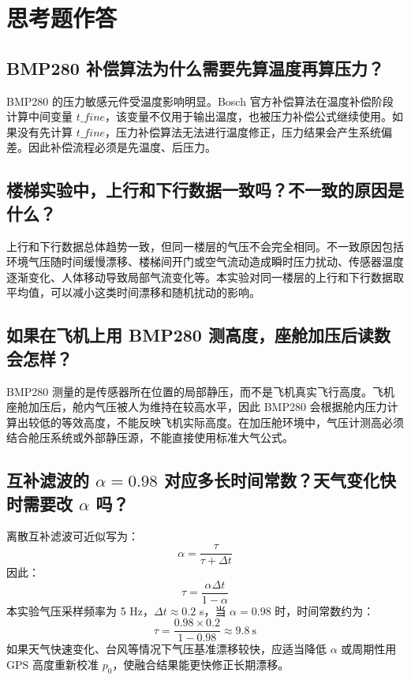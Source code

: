 \documentclass[UTF8,a4paper,12pt]{ctexart}
\begin{document}
\section{思考题作答}

\subsection{BMP280 补偿算法为什么需要先算温度再算压力？}

BMP280 的压力敏感元件受温度影响明显。Bosch 官方补偿算法在温度补偿阶段计算中间变量 $t\_fine$，该变量不仅用于输出温度，也被压力补偿公式继续使用。如果没有先计算 $t\_fine$，压力补偿算法无法进行温度修正，压力结果会产生系统偏差。因此补偿流程必须是先温度、后压力。

\subsection{楼梯实验中，上行和下行数据一致吗？不一致的原因是什么？}

上行和下行数据总体趋势一致，但同一楼层的气压不会完全相同。不一致原因包括环境气压随时间缓慢漂移、楼梯间开门或空气流动造成瞬时压力扰动、传感器温度逐渐变化、人体移动导致局部气流变化等。本实验对同一楼层的上行和下行数据取平均值，可以减小这类时间漂移和随机扰动的影响。

\subsection{如果在飞机上用 BMP280 测高度，座舱加压后读数会怎样？}

BMP280 测量的是传感器所在位置的局部静压，而不是飞机真实飞行高度。飞机座舱加压后，舱内气压被人为维持在较高水平，因此 BMP280 会根据舱内压力计算出较低的等效高度，不能反映飞机实际高度。在加压舱环境中，气压计测高必须结合舱压系统或外部静压源，不能直接使用标准大气公式。

\subsection{互补滤波的 $\alpha=0.98$ 对应多长时间常数？天气变化快时需要改 $\alpha$ 吗？}

离散互补滤波可近似写为：
\begin{equation}
\alpha = \frac{\tau}{\tau + \Delta t}
\end{equation}
因此：
\begin{equation}
\tau = \frac{\alpha \Delta t}{1-\alpha}
\end{equation}
本实验气压采样频率为 5 Hz，$\Delta t \approx 0.2$ s，当 $\alpha=0.98$ 时，时间常数约为：
\[
\tau = \frac{0.98 \times 0.2}{1-0.98} \approx 9.8\ \mathrm{s}
\]
如果天气快速变化、台风等情况下气压基准漂移较快，应适当降低 $\alpha$ 或周期性用 GPS 高度重新校准 $p_0$，使融合结果能更快修正长期漂移。
\end{document}
